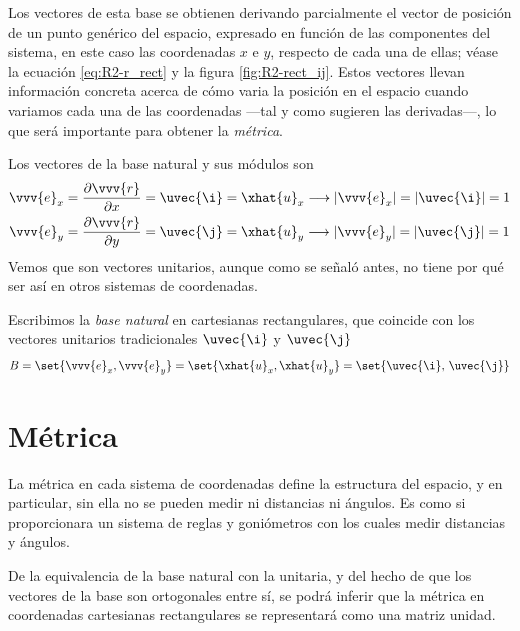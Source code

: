 Los vectores de esta base se obtienen derivando parcialmente el vector de
posición de un punto genérico del espacio, expresado en función de las
componentes del sistema, en este caso las coordenadas $x$ e $y$, respecto de
cada una de ellas; véase la ecuación \eqref{eq:R2-r_rect} y la figura
\ref{fig:R2-rect_ij}.
Estos vectores llevan información concreta acerca de cómo varia la posición en
el espacio cuando variamos cada una de las coordenadas ---tal y como sugieren
las derivadas---, lo que será importante para obtener la \emph{métrica}.

Los vectores de la base natural y sus módulos son
\begin{subequations}
  \begin{align}\label{eq:R2-cart-ex}
    \vvv{e}_x
    &=
      \dfrac{\partial\vvv{r}}{\partial x}
      = \uvec{\i}
      = \xhat{u}_x
      \longrightarrow
    |\vvv{e}_x| = |\uvec{\i}| = 1\\
    \label{eq:R2-cart-ey}
    \vvv{e}_y
    &= \dfrac{\partial\vvv{r}}{\partial y}
      = \uvec{\j}
      = \xhat{u}_y
      \longrightarrow
    |\vvv{e}_y| = |\uvec{\j}| = 1
  \end{align}
\end{subequations}
Vemos que son vectores unitarios, aunque como se señaló antes, no tiene por qué
ser así en otros sistemas de coordenadas.

Escribimos la \emph{base natural} en cartesianas rectangulares, que coincide
con los vectores unitarios tradicionales $\uvec{\i}$ y $\uvec{\j}$
\begin{equation}\label{eq:R2-cart-base}
  B
  =\set{\vvv{e}_x, \vvv{e}_y}
  = \set{\xhat{u}_x, \xhat{u}_y}
  = \set{\uvec{\i},\, \uvec{\j}}
\end{equation}


\section{Métrica}
La métrica en cada sistema de coordenadas define la estructura del espacio, y
en particular, sin ella no se pueden medir ni distancias ni ángulos. Es como si
proporcionara un sistema de reglas y goniómetros con los cuales medir
distancias y ángulos.

De la equivalencia de la base natural con la unitaria, y del hecho de que los
vectores de la base son ortogonales entre sí, se podrá inferir que la métrica
en coordenadas cartesianas rectangulares se representará como una matriz unidad.

